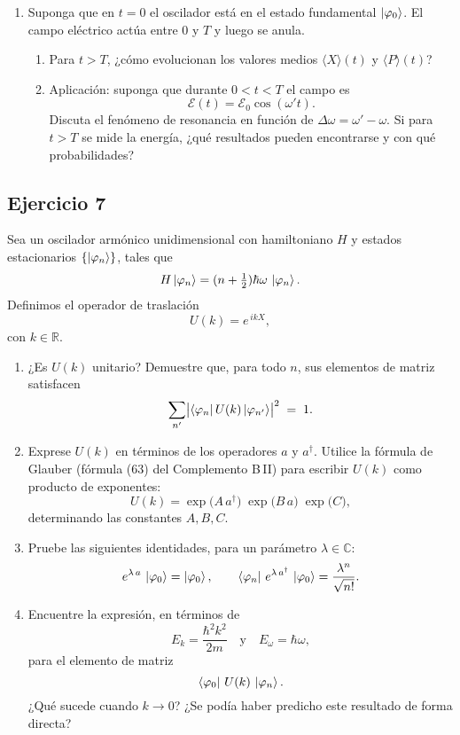 \documentclass[a4paper,11pt]{article}
\begin{document}
\begin{enumerate}
  \item Suponga que en \(t=0\) el oscilador está en el estado fundamental \(\ket{\varphi_0}\). El campo eléctrico actúa entre \(0\) y \(T\) y luego se anula.  
  \begin{enumerate}
    \item Para \(t>T\), ¿cómo evolucionan los valores medios \(\langle X\rangle(t)\) y \(\langle P\rangle(t)\)?  
    \item Aplicación: suponga que durante \(0<t<T\) el campo es  
    \[
      \mathcal{E}(t)=\mathcal{E}_0\cos(\omega' t).
    \]
    Discuta el fenómeno de resonancia en función de \(\Delta\omega=\omega'-\omega\).  
    Si para \(t>T\) se mide la energía, ¿qué resultados pueden encontrarse y con qué probabilidades?
  \end{enumerate}
\end{enumerate}

\subsection*{Ejercicio 7}

Sea un oscilador armónico unidimensional con hamiltoniano \(H\) y estados estacionarios \(\{\ket{\varphi_n}\}\), tales que
\[
  H\ket{\varphi_n}=(n+\tfrac12)\hbar\omega\,\ket{\varphi_n}.
\]
Definimos el operador de traslación
\[
  U(k)=e^{\,i k X},
\]
con \(k\in\mathbb{R}\).

\begin{enumerate}
  \item ¿Es \(U(k)\) unitario? Demuestre que, para todo \(n\), sus elementos de matriz satisfacen
  \[
    \sum_{n'}\bigl|\bra{\varphi_n}U(k)\ket{\varphi_{n'}}\bigr|^2 \;=\;1.
  \]
  
  \item Exprese \(U(k)\) en términos de los operadores \(a\) y \(a^\dagger\). Utilice la fórmula de Glauber (fórmula (63) del Complemento B\,II) para escribir \(U(k)\) como producto de exponentes:
  \[
    U(k)=\exp\bigl(A\,a^\dagger\bigr)\;\exp\bigl(B\,a\bigr)\;\exp\bigl(C\bigr),
  \]
  determinando las constantes \(A,B,C\).
  
  \item Pruebe las siguientes identidades, para un parámetro \(\lambda\in\mathbb{C}\):
  \[
    e^{\lambda\,a}\,\ket{\varphi_0} = \ket{\varphi_0},
    \qquad
    \bra{\varphi_n}\,e^{\lambda\,a^\dagger}\,\ket{\varphi_0}
    = \frac{\lambda^n}{\sqrt{n!}}.
  \]

  \item Encuentre la expresión, en términos de 
  \[
    E_k = \frac{\hbar^2k^2}{2m}
    \quad\text{y}\quad
    E_\omega = \hbar\omega,
  \]
  para el elemento de matriz
  \[
    \bra{\varphi_0}\,U(k)\,\ket{\varphi_n}.
  \]
  ¿Qué sucede cuando \(k\to0\)? ¿Se podía haber predicho este resultado de forma directa?
\end{enumerate}
\end{document}
